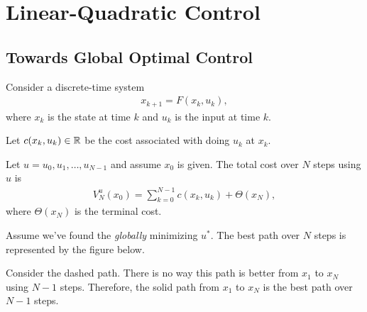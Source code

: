 \chapter{Linear-Quadratic Control}

\section{Towards Global Optimal Control}
Consider a discrete-time system
\begin{gather}
  x_{k+1} = F(x_k,u_k),
\end{gather}
where $x_k$ is the state at time $k$ and $u_k$ is the input at time $k$.

Let $c(x_k,u_k)\in\mathbb{R}$ be the cost associated with doing $u_k$ at $x_k$.

Let $u=u_0,u_1,\dots,u_{N-1}$ and assume $x_0$ is given. The total cost over $N$ steps using $u$ is
\begin{gather}
  V_N^u(x_0) = \sum_{k=0}^{N-1} c(x_k,u_k) + \Theta(x_N),
\end{gather}
where $\Theta(x_N)$ is the terminal cost.

Assume we've found the \emph{globally} minimizing $u^*$. The best path over $N$ steps is represented by the figure below.
\begin{center}
\end{center}
Consider the dashed path. There is no way this path is better from $x_1$ to $x_N$ using $N-1$ steps. Therefore, the solid path from $x_1$ to $x_N$ is the best path over $N-1$ steps.

